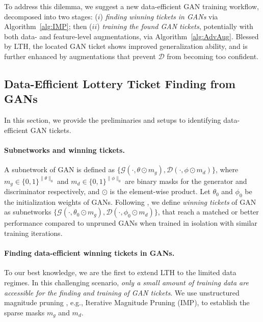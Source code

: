 \documentclass{article}
\begin{document}
To address this dilemma, we suggest a new data-efficient GAN training workflow, decomposed into two stages: ($i$) \emph{ finding winning tickets in GANs} via Algorithm~\ref{alg:IMP}; then ($ii$) \emph{ training the found GAN tickets}, potentially with both data- and feature-level augmentations, via Algorithm~\ref{alg:AdvAug}. Blessed by LTH, the located GAN ticket shows improved generalization ability, and is further enhanced by augmentations that prevent $\mathcal{D}$ from becoming too confident.

\vspace{-0.5em}
\subsection{Data-Efficient Lottery Ticket Finding from GANs}
\vspace{-0.5em}
In this section, we provide the preliminaries and setups to identifying data-efficient GAN tickets.

\vspace{-0.5em}
\paragraph{Subnetworks and winning tickets.} A subnetwork of GAN is defined as $\{\mathcal{G}(\cdot,\theta\odot m_g),\mathcal{D}(\cdot,\phi\odot m_d)\}$, where $m_g\in\{0,1\}^{\|\theta\|_0}$ and $m_d\in\{0,1\}^{\|\phi\|_0}$ are binary masks for the generator and discriminator respectively, and $\odot$ is the element-wise product. Let $\theta_0$ and $\phi_0$ be the initialization weights of GANs. Following \cite{Frankle:2019vz,chen2021gans}, we define \textit{winning tickets} of GAN as subnetworks $\{\mathcal{G}(\cdot,\theta_0\odot m_g),\mathcal{D}(\cdot,\phi_0\odot m_d)\}$, that reach a matched or better performance compared to unpruned GANs when trained in isolation with similar training iterations. 

\vspace{-0.5em}
\paragraph{Finding data-efficient winning tickets in GANs.} To our best knowledge, we are the first to extend LTH to the limited data regimes. In this challenging scenario, \emph{only a small amount of training data are accessible for the finding and training of GAN tickets}. We use unstructured magnitude pruning \cite{han2015deep}, e.g., Iterative Magnitude Pruning (IMP), to establish the sparse masks $m_g$ and $m_d$.
\end{document}
